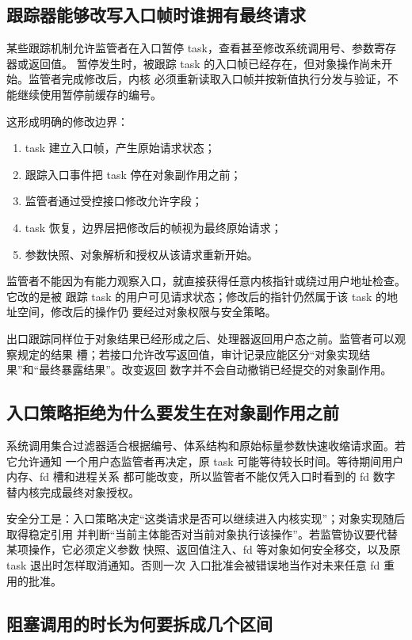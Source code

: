 \subsection{跟踪器能够改写入口帧时谁拥有最终请求}

某些跟踪机制允许监管者在入口暂停 task，查看甚至修改系统调用号、参数寄存器或返回值。
暂停发生时，被跟踪 task 的入口帧已经存在，但对象操作尚未开始。监管者完成修改后，内核
必须重新读取入口帧并按新值执行分发与验证，不能继续使用暂停前缓存的编号。

这形成明确的修改边界：

\begin{enumerate}
\tightlist
\item task 建立入口帧，产生原始请求状态；
\item 跟踪入口事件把 task 停在对象副作用之前；
\item 监管者通过受控接口修改允许字段；
\item task 恢复，边界层把修改后的帧视为最终原始请求；
\item 参数快照、对象解析和授权从该请求重新开始。
\end{enumerate}

监管者不能因为有能力观察入口，就直接获得任意内核指针或绕过用户地址检查。它改的是被
跟踪 task 的用户可见请求状态；修改后的指针仍然属于该 task 的地址空间，修改后的操作仍
要经过对象权限与安全策略。

出口跟踪同样位于对象结果已经形成之后、处理器返回用户态之前。监管者可以观察规定的结果
槽；若接口允许改写返回值，审计记录应能区分“对象实现结果”和“最终暴露结果”。改变返回
数字并不会自动撤销已经提交的对象副作用。

\subsection{入口策略拒绝为什么要发生在对象副作用之前}

系统调用集合过滤器适合根据编号、体系结构和原始标量参数快速收缩请求面。若它允许通知
一个用户态监管者再决定，原 task 可能等待较长时间。等待期间用户内存、fd 槽和进程关系
都可能改变，所以监管者不能仅凭入口时看到的 fd 数字替内核完成最终对象授权。

安全分工是：入口策略决定“这类请求是否可以继续进入内核实现”；对象实现随后取得稳定引用
并判断“当前主体能否对当前对象执行该操作”。若监管协议要代替某项操作，它必须定义参数
快照、返回值注入、fd 等对象如何安全移交，以及原 task 退出时怎样取消通知。否则一次
入口批准会被错误地当作对未来任意 fd 重用的批准。

\subsection{阻塞调用的时长为何要拆成几个区间}

